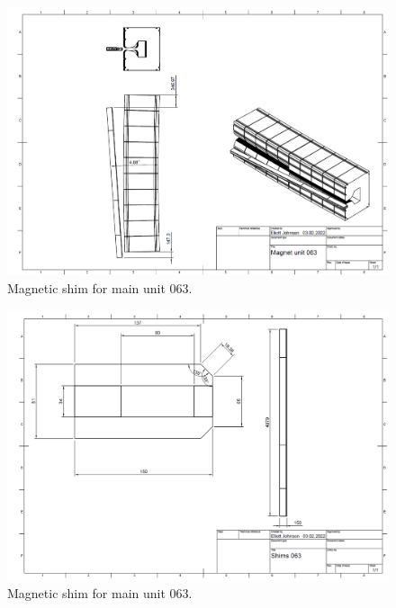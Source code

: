 \begin{figure}[h]
    \centering
    \includegraphics[width=1.0\textwidth]{Appendix/images/mu63_shim.png}
    \caption{Magnetic shim for main unit 063.}
    \label{fig:mu63_shim}
\end{figure}

\begin{figure}[h]
    \centering
    \includegraphics[width=1.0\textwidth]{Appendix/images/mu63_shim2.png}
    \caption{Magnetic shim for main unit 063.}
    \label{fig:mu63_shim2}
\end{figure}

